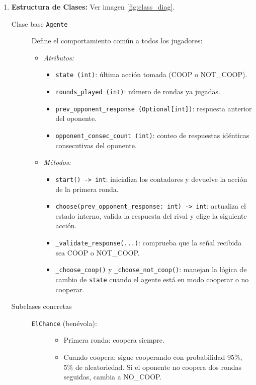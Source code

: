 \documentclass{article}
\begin{document}
\begin{enumerate}
  \item \textbf{Estructura de Clases:} Ver imagen \ref{fig:class_diag}.
    \begin{description}
      \item[Clase base \texttt{Agente}] Define el comportamiento común a todos los jugadores:
        \begin{itemize}
          \item \emph{Atributos:}
            \begin{itemize}
              \item \texttt{state (int)}: última acción tomada (COOP o NOT\_COOP).
              \item \texttt{rounds\_played (int)}: número de rondas ya jugadas.
              \item \texttt{prev\_opponent\_response (Optional[int])}: respuesta anterior del oponente.
              \item \texttt{opponent\_consec\_count (int)}: conteo de respuestas idénticas consecutivas del oponente.
            \end{itemize}
          \item \emph{Métodos:}
            \begin{itemize}
              \item \texttt{start() -> int}: inicializa los contadores y devuelve la acción de la primera ronda.
              \item \texttt{choose(prev\_opponent\_response: int) -> int}: actualiza el estado interno, valida la respuesta del rival y elige la siguiente acción.
              \item \texttt{\_validate\_response(...)}: comprueba que la señal recibida sea COOP o NOT\_COOP.
              \item \texttt{\_choose\_coop()} y \texttt{\_choose\_not\_coop()}: manejan la lógica de cambio de \texttt{state} cuando el agente está en modo cooperar o no cooperar.
            \end{itemize}
        \end{itemize}
      \item[Subclases concretas]
        \begin{description}
          \item[\texttt{ElChance} (benévola):]
            \begin{itemize}
              \item Primera ronda: coopera siempre.
              \item Cuando coopera: sigue cooperando con probabilidad 95\%, 5\% de aleatoriedad. Si el oponente no coopera dos rondas seguidas, cambia a NO\_COOP.

\end{itemize}
\end{description}
\end{description}
\end{enumerate}
\end{document}
